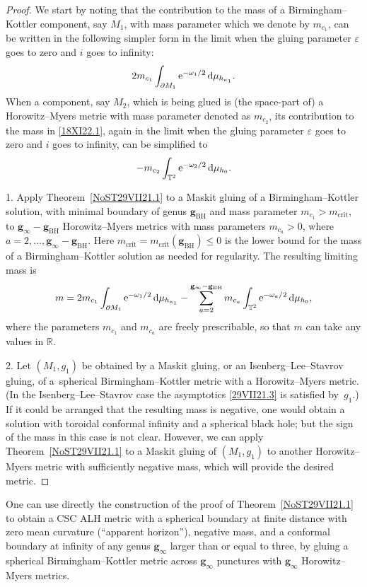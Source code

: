 \documentclass[pdftex]{sigma}
\numberwithin{equation}{section}
\newcommand{\ominf}{\blue{\omega}}
\newcommand{\mcone}{m_{c_1}}
\newcommand{\mctwo}{m_{c_2}}
\newcommand{\mca}{m_{c_a}}
\newcommand{\blue}[1]{{\color{blue}#1}}
\newcommand{\T}{{\mathbb T}}
\newcommand{\R}{\mathbb R}
\renewcommand{\blue}[1]{#1}
\begin{document}
\begin{proof}
We start by noting that the contribution to the mass of a Bir\-ming\-ham--Kottler component, say $M_1$, with mass parameter which we denote by $\mcone $, can be written in the following simpler form in the limit when the gluing parameter $\varepsilon$ goes to zero and $i$ goes to infinity:
\[
 2 \mcone \int_{\partial M_1} {\rm e}^{-\ominf_1 /2}\, {\rm d}\mu_{h_{\kappa_1}}.
\]
When a component, say $M_2$, which is being glued is (the space-part of) a Horowitz--Myers metric with mass parameter {denoted as} $\mctwo$, its contribution to the mass in \eqref{18XI22.1}, again in the limit when the gluing parameter $\varepsilon$ goes to zero and $i$ goes to infinity, can be simplified to
\[
 - \mctwo \int_{\T^2} {\rm e}^{-\ominf_2 /2}\, {\rm d}\mu_{h_0}.
\]

1. Apply Theorem~\ref{NoST29VII21.1} to a Maskit gluing of a Birmingham--Kottler solution, with minimal boundary of genus {${{\mathbf g}_{\mathrm{BH}}}$} and mass parameter {$\mcone >m_{\text{crit}}$}, to ${{\mathbf g}_\infty}-{{\mathbf g}_{\mathrm{BH}}}$ Horowitz--Myers metrics with mass parameters $\mca >0$, where $a=2,\dots,{{\mathbf g}_\infty}-{{\mathbf g}_{\mathrm{BH}}}$.
{Here $m_{\text{crit}}=m_{\text{crit}}({{\mathbf g}_{\mathrm{BH}}})\le 0$ is the lower bound for the mass of a Birmingham--Kottler solution as needed for regularity.} The resulting limiting mass is
\[
 m= 2 \mcone \int_{\partial M_1} {\rm e}^{-\ominf_1 /2} \,{\rm d}\mu_{h_{\kappa_1}}
 - \sum_{a=2}^{{{\mathbf g}_\infty}-{{\mathbf g}_{\mathrm{BH}}}} \mca \int_{\T^2} {\rm e}^{-\ominf_a /2}\, {\rm d}\mu_{h_0},
\]
where the parameters $\mcone$ and $\mca$ are freely prescribable, {so that $m$ can take any values in $\R$}.

2. Let $(M_1,g_1)$ be obtained by a Maskit gluing, or an Isenberg--Lee--Stavrov~\cite{ILS} gluing, of a~spherical Birmingham--Kottler metric with a Horowitz--Myers metric. (In the Isenberg--Lee--Stavrov case the asymptotics \eqref{29VII21.3} is satisfied by~$g_1$.)
If it could be arranged that the resulting mass is negative, one would obtain a solution with toroidal conformal infinity and a spherical black hole; but the sign of the mass in this case is not clear. However, we can apply Theorem~\ref{NoST29VII21.1} to a Maskit gluing of $(M_1,g_1)$ to another Horowitz--Myers metric with sufficiently negative mass, which will provide the desired metric.
\end{proof}

\begin{Remark} \label{R9VI22}
One can use directly the construction of the proof of Theorem~\ref{NoST29VII21.1} to obtain a CSC ALH metric with a spherical boundary at finite distance with zero mean curvature (``apparent horizon''), negative mass, and a conformal boundary at infinity of any genus ${{\mathbf g}_\infty}$ larger than or equal to three,
by gluing a spherical Birmingham--Kottler metric across ${{\mathbf g}_\infty}$ punctures with ${{\mathbf g}_\infty}$ Horowitz--Myers metrics.
\end{Remark}
\end{document}
